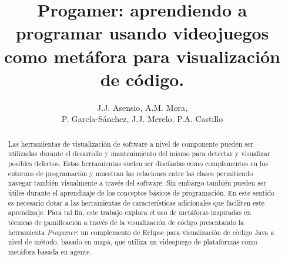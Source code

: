 \documentclass{llncs}
\begin{document}

\title{Progamer: aprendiendo a programar usando videojuegos como metáfora para visualización de código.}


\author{J.J. Asensio, A.M. Mora, \\P. García-Sánchez, J.J. Merelo, P.A. Castillo}

\maketitle
%
%
\begin{abstract} 
Las herramientas de visualización de software a nivel de componente
pueden ser utilizadas durante el desarrollo y mantenimiento del mismo
para detectar y visualizar posibles defectos. Estas herramientas
suelen ser diseñadas como complementos en los entornos de programación y
muestran las relaciones entre las clases permitiendo navegar también
visualmente a través del software. Sin embargo también pueden ser
útiles durante el aprendizaje de los conceptos básicos de
programación. En este sentido es necesario dotar a las herramientas de
características adicionales que faciliten este aprendizaje. Para tal
fin, este trabajo explora el uso de metáforas inspiradas en técnicas de gamificación a través de la visualización de código presentando la herramienta \emph{Progamer}: un
complemento de Eclipse para visualización de código Java a nivel de método,
basado en mapa, que utiliza un videojuego de plataformas como metáfora basada en agente.
\end{abstract}


%
%
\end{document}
